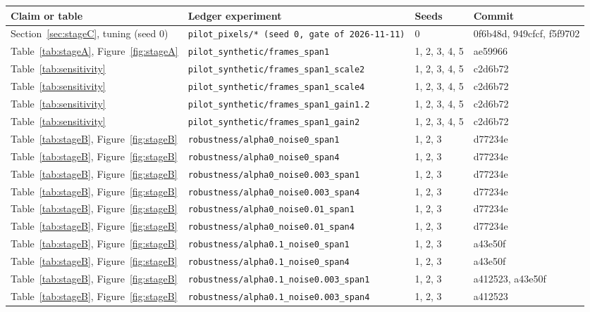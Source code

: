 \begin{longtable}{p{3.6cm}p{6.2cm}p{1.6cm}p{1.6cm}}\toprule
Claim or table & Ledger experiment & Seeds & Commit\\\midrule\endhead
Section~\ref{sec:stageC}, tuning (seed 0) & \texttt{pilot\_pixels/* (seed 0, gate of 2026-11-11)} & 0 & 0f6b48d, 949cfcf, f5f9702\\
Table~\ref{tab:stageA}, Figure~\ref{fig:stageA} & \texttt{pilot\_synthetic/frames\_span1} & 1, 2, 3, 4, 5 & ae59966\\
Table~\ref{tab:sensitivity} & \texttt{pilot\_synthetic/frames\_span1\_scale2} & 1, 2, 3, 4, 5 & c2d6b72\\
Table~\ref{tab:sensitivity} & \texttt{pilot\_synthetic/frames\_span1\_scale4} & 1, 2, 3, 4, 5 & c2d6b72\\
Table~\ref{tab:sensitivity} & \texttt{pilot\_synthetic/frames\_span1\_gain1.2} & 1, 2, 3, 4, 5 & c2d6b72\\
Table~\ref{tab:sensitivity} & \texttt{pilot\_synthetic/frames\_span1\_gain2} & 1, 2, 3, 4, 5 & c2d6b72\\
Table~\ref{tab:stageB}, Figure~\ref{fig:stageB} & \texttt{robustness/alpha0\_noise0\_span1} & 1, 2, 3 & d77234e\\
Table~\ref{tab:stageB}, Figure~\ref{fig:stageB} & \texttt{robustness/alpha0\_noise0\_span4} & 1, 2, 3 & d77234e\\
Table~\ref{tab:stageB}, Figure~\ref{fig:stageB} & \texttt{robustness/alpha0\_noise0.003\_span1} & 1, 2, 3 & d77234e\\
Table~\ref{tab:stageB}, Figure~\ref{fig:stageB} & \texttt{robustness/alpha0\_noise0.003\_span4} & 1, 2, 3 & d77234e\\
Table~\ref{tab:stageB}, Figure~\ref{fig:stageB} & \texttt{robustness/alpha0\_noise0.01\_span1} & 1, 2, 3 & d77234e\\
Table~\ref{tab:stageB}, Figure~\ref{fig:stageB} & \texttt{robustness/alpha0\_noise0.01\_span4} & 1, 2, 3 & d77234e\\
Table~\ref{tab:stageB}, Figure~\ref{fig:stageB} & \texttt{robustness/alpha0.1\_noise0\_span1} & 1, 2, 3 & a43e50f\\
Table~\ref{tab:stageB}, Figure~\ref{fig:stageB} & \texttt{robustness/alpha0.1\_noise0\_span4} & 1, 2, 3 & a43e50f\\
Table~\ref{tab:stageB}, Figure~\ref{fig:stageB} & \texttt{robustness/alpha0.1\_noise0.003\_span1} & 1, 2, 3 & a412523, a43e50f\\
Table~\ref{tab:stageB}, Figure~\ref{fig:stageB} & \texttt{robustness/alpha0.1\_noise0.003\_span4} & 1, 2, 3 & a412523\\

\end{longtable}
